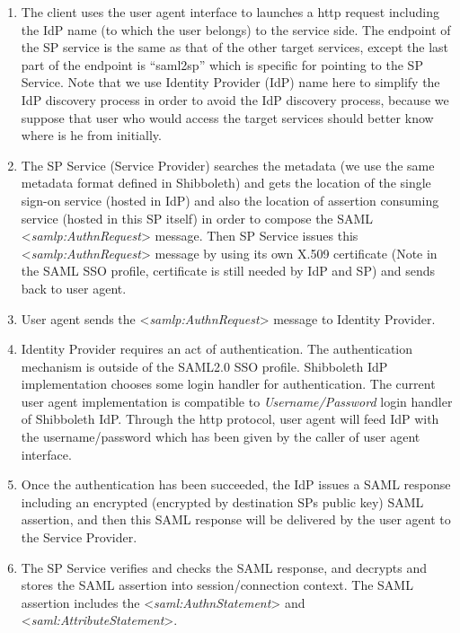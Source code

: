 \documentclass{article}
\newcommand\liststyleLv{%
\renewcommand\theenumi{\arabic{enumi}}
\renewcommand\theenumii{\arabic{enumii}}
\renewcommand\theenumiii{\arabic{enumiii}}
\renewcommand\theenumiv{\arabic{enumiv}}
\renewcommand\labelenumi{\theenumi.}
\renewcommand\labelenumii{\theenumii.}
\renewcommand\labelenumiii{\theenumiii.}
\renewcommand\labelenumiv{\theenumiv.}
}
\begin{document}
\liststyleLv
\begin{enumerate}
\item The client uses the user agent interface to launches a http
request including the IdP name (to which the user belongs) to the
service side. The endpoint of the SP service is the same as that of the
other target services, except the last part of the endpoint is
{\textquotedblleft}saml2sp{\textquotedblright} which is specific for
pointing to the SP Service. Note that we use Identity Provider (IdP)
name here to simplify the IdP discovery process in order to avoid the
IdP discovery process, because we suppose that user who would access
the target services should better know where is he from initially.
\item The SP Service (Service Provider) searches the metadata (we use
the same metadata format defined in Shibboleth) and gets the location
of the single sign-on service (hosted in IdP) and also the location of
assertion consuming service (hosted in this SP itself) in order to
compose the SAML {\textless}\textit{samlp:AuthnRequest}{\textgreater}
message. Then SP Service issues this
{\textless}\textit{samlp:AuthnRequest}{\textgreater} message by using
its own X.509 certificate (Note in the SAML SSO profile, certificate is
still needed by IdP and SP) and sends back to user agent.
\item User agent sends the
{\textless}\textit{samlp:AuthnRequest}{\textgreater} message to
Identity Provider.
\item Identity Provider requires an act of authentication. The
authentication mechanism is outside of the SAML2.0 SSO profile.
Shibboleth IdP implementation chooses some login handler for
authentication. The current user agent implementation is compatible to
\textit{Username/Password} login handler of Shibboleth IdP. Through the
http protocol, user agent will feed IdP with the username/password
which has been given by the caller of user agent interface.
\item Once the authentication has been succeeded, the IdP issues a SAML
response including an encrypted (encrypted by destination
SP{\textquotesingle}s public key) SAML assertion, and then this SAML
response will be delivered by the user agent to the Service Provider. 
\item The SP Service verifies and checks the SAML response, and decrypts
and stores the SAML assertion into session/connection context. The SAML
assertion includes the
{\textless}\textit{saml:AuthnStatement}{\textgreater} and
{\textless}\textit{saml:AttributeStatement}{\textgreater}.

\end{enumerate}
\end{document}
